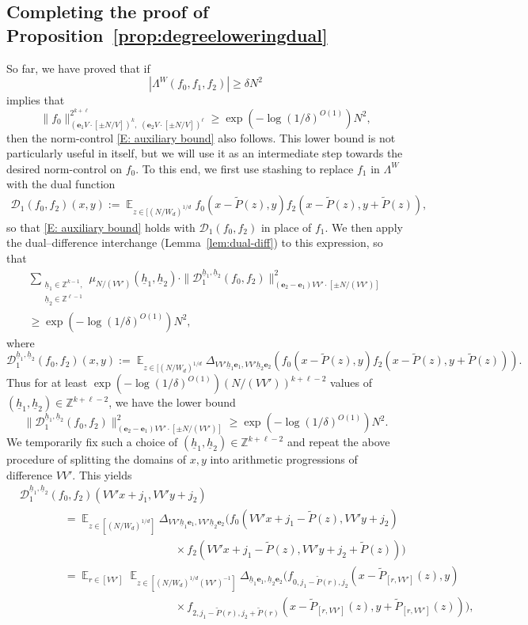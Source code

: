 \documentclass[11pt]{amsart}
\theoremstyle{definition}
\DeclareMathOperator*{\E}{\mathbb{E}}
\newcommand{\Z}{{\mathbb Z}}
\newcommand{\CD}{{\mathcal D}}
\newcommand{\be}{{\mathbf{e}}}
\newcommand{\uh}{{\underline{h}}}
\begin{document}
\subsection{Completing the proof of Proposition~\ref{prop:degreeloweringdual}}\label{S: completing}
So far, we have proved that if $$|\Lambda^W(f_0, f_1, f_2)| \ge \delta N^2$$
implies that
$$\|f_0\|_{(\be_1V \cdot [\pm N/V])^k,\; (\be_2 V \cdot [\pm N/V])^\ell}^{2^{k+\ell}} \geq \exp(-\log(1/\delta)^{O(1)}) N^2,$$
then the norm-control \eqref{E: auxiliary bound} also follows. This lower bound is not particularly useful in itself, but we will use it as an intermediate step towards the desired norm-control on $f_0$. To this end, we first use stashing to replace $f_1$ in $\Lambda^W$ with the dual function
\begin{align*}
    \CD_1(f_0,f_2)(x,y):=\E_{z \in [(N/W_d)^{1/d}} f_0(x-\widetilde P(z),y)f_2(x-\widetilde P(z),y+\widetilde P(z)),
\end{align*}
so that \eqref{E: auxiliary bound} holds with $\CD_1(f_0,f_2)$ in place of $f_1$. We then apply the dual--difference interchange (Lemma~\ref{lem:dual-diff}) to this expression, so that
\begin{multline*}
    \sum_{\substack{\uh_1 \in \mathbb{Z}^{k-1},\\ \uh_2 \in \mathbb{Z}^{\ell-1}}} \mu_{N/(VV')}(\uh_1,\uh_2)\cdot \|\mathcal{D}_1^{\uh_1,\uh_2}(f_0,f_2)\|_{(\be_2-\be_1)VV' \cdot [\pm N/(VV')]}^2\\
    \geq \exp(-\log(1/\delta)^{O(1)}) N^2,
\end{multline*}
where
$$\mathcal{D}_1^{\uh_1,\uh_2}(f_0,f_2)(x,y):=\E_{z \in [(N/W_d)^{1/d}} \Delta_{VV'\uh_1\be_1,VV'\uh_2 \be_2}(f_0(x-\widetilde P(z),y)f_2(x-\widetilde P(z),y+\widetilde P(z))).$$
Thus for at least $\exp(-\log(1/\delta)^{O(1)})(N/(VV'))^{k+\ell-2}$ values of $(\uh_1, \uh_2)\in\Z^{k+\ell-2}$, we have the lower bound
$$\|\mathcal{D}_1^{\uh_1,\uh_2}(f_0,f_2)\|_{(\be_2-\be_1)VV' \cdot [\pm N/(VV')]}^2 \geq \exp(-\log(1/\delta)^{O(1)}) N^2.$$
We temporarily fix such a choice of $(\uh_1, \uh_2)\in\Z^{k+\ell-2}$ and repeat the above procedure of splitting the domains of $x,y$ into arithmetic progressions of difference $VV'$. This yields
\begin{align*}
    &\mathcal{D}_1^{\uh_1,\uh_2}(f_0,f_2)(VV'x+j_1,VV'y+j_2)\\
    &\qquad\qquad=\E_{z \in [(N/W_d)^{1/d}]} \Delta_{VV'\uh_1\be_1,VV'\uh_2 \be_2}(f_0(VV'x+j_1-\widetilde P(z),VV'y+j_2)\\
    &\qquad\qquad\qquad\qquad\qquad\qquad\qquad\times f_2(VV'x+j_1-\widetilde P(z),VV'y+j_2+\widetilde P(z)))\\
    &\qquad\qquad=\E_{r\in[VV']}\E_{z \in [(N/W_d)^{1/d}(VV')^{-1}]} \Delta_{\uh_1\be_1,\uh_2 \be_2}(f_{0, j_1 - \widetilde P(r), j_2}(x-\widetilde P_{[r,VV']}(z),y)\\
    &\qquad\qquad\qquad\qquad\qquad\qquad\qquad\times f_{2, j_1 - \widetilde P(r), j_2 + \widetilde P(r)}(x-\widetilde P_{[r,VV']}(z),y+\widetilde P_{[r,VV']}(z))),
\end{align*}
\end{document}
